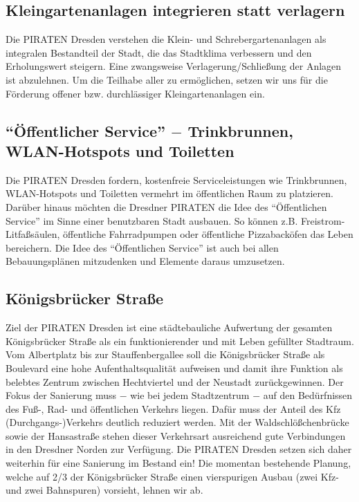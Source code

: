 \documentclass[a4paper, 11pt]{article}
\begin{document}
\subsection{Kleingartenanlagen integrieren statt verlagern}
Die PIRATEN Dresden verstehen die Klein- und Schrebergartenanlagen als integralen Bestandteil der Stadt, die das Stadtklima verbessern und den Erholungswert steigern. Eine zwangsweise Verlagerung/Schließung der Anlagen ist abzulehnen. Um die Teilhabe aller zu ermöglichen, setzen wir uns für die Förderung offener bzw. durchlässiger Kleingartenanlagen ein.


\subsection{``Öffentlicher Service'' $-$ Trinkbrunnen, WLAN-Hotspots und Toiletten}
Die PIRATEN Dresden fordern, kostenfreie Serviceleistungen wie Trinkbrunnen, WLAN-Hotspots und Toiletten vermehrt im öffentlichen Raum zu platzieren. Darüber hinaus möchten die Dresdner PIRATEN die Idee des ``Öffentlichen Service'' im Sinne einer benutzbaren Stadt ausbauen. So können z.B. Freistrom-Litfaßsäulen, öffentliche Fahrradpumpen oder öffentliche Pizzabacköfen das Leben bereichern. Die Idee des ``Öffentlichen Service'' ist auch bei allen Bebauungsplänen mitzudenken und Elemente daraus umzusetzen.


\subsection{Königsbrücker Straße}
Ziel der PIRATEN Dresden ist eine städtebauliche Aufwertung der gesamten Königsbrücker Straße als ein funktionierender und mit Leben gefüllter Stadtraum. Vom Albertplatz bis zur Stauffenbergallee soll die Königsbrücker Straße als Boulevard eine hohe Aufenthaltsqualität aufweisen und damit ihre Funktion als belebtes Zentrum zwischen Hechtviertel und der Neustadt zurückgewinnen. Der Fokus der Sanierung muss $-$ wie bei jedem Stadtzentrum $-$ auf den Bedürfnissen des Fuß-, Rad- und öffentlichen Verkehrs liegen. Dafür muss der Anteil des Kfz (Durchgangs-)Verkehrs deutlich reduziert werden. Mit der Waldschlößchenbrücke sowie der Hansastraße stehen dieser Verkehrsart ausreichend gute Verbindungen in den Dresdner Norden zur Verfügung. Die PIRATEN Dresden setzen sich daher weiterhin für eine Sanierung im Bestand ein! Die momentan bestehende Planung, welche auf 2/3 der Königsbrücker Straße einen vierspurigen Ausbau (zwei Kfz- und zwei Bahnspuren) vorsieht, lehnen wir ab.
\end{document}
